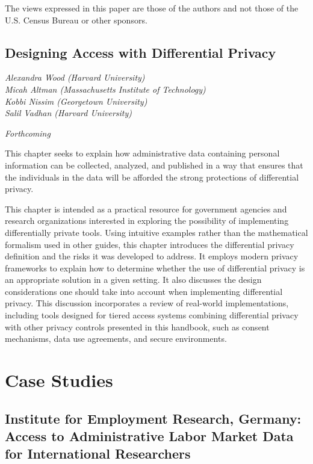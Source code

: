 \documentclass[
]{book}
\begin{document}
The views expressed in this paper are those of the authors and not those of the U.S. Census Bureau or other sponsors.

\hypertarget{diffpriv}{%
\chapter{Designing Access with Differential Privacy}\label{diffpriv}}

\emph{Alexandra Wood (Harvard University)}\\
\emph{Micah Altman (Massachusetts Institute of Technology)}\\
\emph{Kobbi Nissim (Georgetown University)}\\
\emph{Salil Vadhan (Harvard University)}

\emph{Forthcoming}

This chapter seeks to explain how administrative data containing personal information can be collected, analyzed, and published in a way that ensures that the individuals in the data will be afforded the strong protections of differential privacy.

This chapter is intended as a practical resource for government agencies and research organizations interested in exploring the possibility of implementing differentially private tools. Using intuitive examples rather than the mathematical formalism used in other guides, this chapter introduces the differential privacy definition and the risks it was developed to address. It employs modern privacy frameworks to explain how to determine whether the use of differential privacy is an appropriate solution in a given setting. It also discusses the design considerations one should take into account when implementing differential privacy. This discussion incorporates a review of real-world implementations, including tools designed for tiered access systems combining differential privacy with other privacy controls presented in this handbook, such as consent mechanisms, data use agreements, and secure environments.

\hypertarget{part-case-studies}{%
\part{Case Studies}\label{part-case-studies}}

\hypertarget{iab}{%
\chapter{Institute for Employment Research, Germany: Access to Administrative Labor Market Data for International Researchers}\label{iab}}
\end{document}
